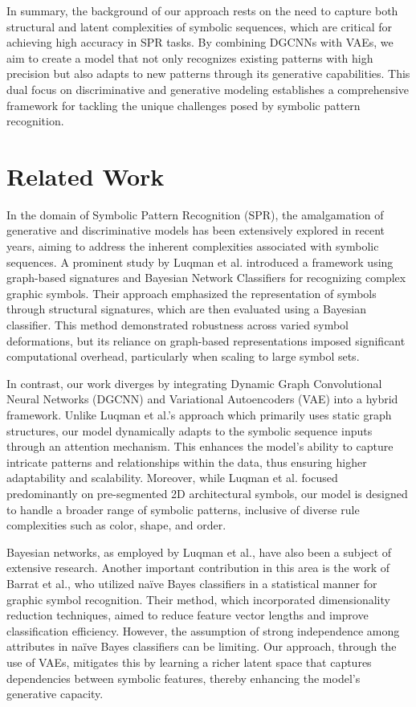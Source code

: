 \documentclass{article}
\begin{document}
In summary, the background of our approach rests on the need to capture both structural and latent complexities of symbolic sequences, which are critical for achieving high accuracy in SPR tasks. By combining DGCNNs with VAEs, we aim to create a model that not only recognizes existing patterns with high precision but also adapts to new patterns through its generative capabilities. This dual focus on discriminative and generative modeling establishes a comprehensive framework for tackling the unique challenges posed by symbolic pattern recognition.

\section{Related Work}
In the domain of Symbolic Pattern Recognition (SPR), the amalgamation of generative and discriminative models has been extensively explored in recent years, aiming to address the inherent complexities associated with symbolic sequences. A prominent study by Luqman et al. introduced a framework using graph-based signatures and Bayesian Network Classifiers for recognizing complex graphic symbols. Their approach emphasized the representation of symbols through structural signatures, which are then evaluated using a Bayesian classifier. This method demonstrated robustness across varied symbol deformations, but its reliance on graph-based representations imposed significant computational overhead, particularly when scaling to large symbol sets. 

In contrast, our work diverges by integrating Dynamic Graph Convolutional Neural Networks (DGCNN) and Variational Autoencoders (VAE) into a hybrid framework. Unlike Luqman et al.’s approach which primarily uses static graph structures, our model dynamically adapts to the symbolic sequence inputs through an attention mechanism. This enhances the model’s ability to capture intricate patterns and relationships within the data, thus ensuring higher adaptability and scalability. Moreover, while Luqman et al. focused predominantly on pre-segmented 2D architectural symbols, our model is designed to handle a broader range of symbolic patterns, inclusive of diverse rule complexities such as color, shape, and order.

Bayesian networks, as employed by Luqman et al., have also been a subject of extensive research. Another important contribution in this area is the work of Barrat et al., who utilized naïve Bayes classifiers in a statistical manner for graphic symbol recognition. Their method, which incorporated dimensionality reduction techniques, aimed to reduce feature vector lengths and improve classification efficiency. However, the assumption of strong independence among attributes in naïve Bayes classifiers can be limiting. Our approach, through the use of VAEs, mitigates this by learning a richer latent space that captures dependencies between symbolic features, thereby enhancing the model’s generative capacity.
\end{document}
